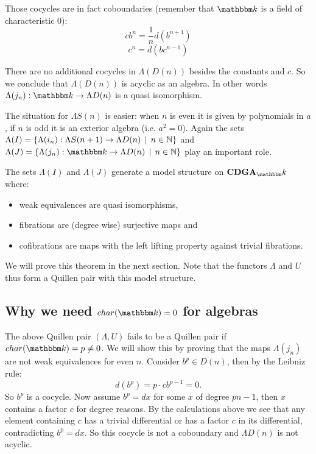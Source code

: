 Those cocycles are in fact coboundaries (remember that $\k$ is a field of characteristic $0$):
$$ c b^n = \frac{1}{n} d(b^{n+1}) $$
$$ c^n = d(b c^{n-1}) $$

There are no additional cocycles in $\Lambda(D(n))$ besides the constants and $c$. So we conclude that $\Lambda(D(n))$ is acyclic as an algebra. In other words $\Lambda(j_n): \k \to \Lambda D(n)$ is a quasi isomorphism.

The situation for $\Lambda S(n)$ is easier: when $n$ is even it is given by polynomials in $a$, if $n$ is odd it is an exterior algebra (i.e. $a^2 = 0$). Again the sets $\Lambda(I) = \{ \Lambda(i_n) : \Lambda S(n+1) \to \Lambda D(n) \,\mid\, n \in \mathbb{N}\}$ and $\Lambda(J) = \{ \Lambda(j_n) : \k \to \Lambda D(n) \I n \in \N\}$ play an important role.

\begin{theorem}
	The sets $\Lambda(I)$ and $\Lambda(J)$ generate a model structure on $\CDGA_\k$ where:
	\begin{itemize}
		\item weak equivalences are quasi isomorphisms,
		\item fibrations are (degree wise) surjective maps and
		\item cofibrations are maps with the left lifting property against trivial fibrations.
	\end{itemize}
\end{theorem}

We will prove this theorem in the next section. Note that the functors $\Lambda$ and $U$ thus form a Quillen pair with this model structure.

\subsection{Why we need $\Char{\k} = 0$ for algebras}
The above Quillen pair $(\Lambda, U)$ fails to be a Quillen pair if $\Char{\k} = p \neq 0$. We will show this by proving that the maps $\Lambda(j_n)$ are not weak equivalences for even $n$. Consider $b^p \in D(n)$, then by the Leibniz rule:
$$ d(b^p) = p \cdot c b^{p-1} = 0. $$
So $b^p$ is a cocycle. Now assume $b^p = dx$ for some $x$ of degree $pn - 1$, then $x$ contains a factor $c$ for degree reasons. By the calculations above we see that any element containing $c$ has a trivial differential or has a factor $c$ in its differential, contradicting $b^p = dx$. So this cocycle is not a coboundary and $\Lambda D(n)$ is not acyclic.




